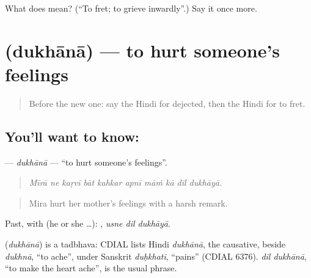 \begin{tcolorbox}[breakable,colback=teal!4,colframe=teal!35!black,title={Before you move on}]
What does  mean? (\textquotedblleft{}To fret; to grieve inwardly\textquotedblright{}.) Say it once more.
\end{tcolorbox}
\section[\texorpdfstring{\hi{दुखाना} (dukhānā)}{दुखाना (dukhānā)}]{ (dukhānā) — to hurt someone's feelings}

\label{lesson:HI-C455-dukhana}



\begin{quote}
Before the new one: say the Hindi for dejected, then the Hindi for to fret.
\end{quote}

\subsection*{You'll want to know: }
\textbf{} — \emph{dukhānā} — \textquotedblleft{}to hurt someone's feelings\textquotedblright{}.

\begin{quote}
         
\end{quote}

\begin{quote}
\emph{Mīrā ne kaṛvī bāt kahkar apnī māṁ kā dil dukhāyā.}
\end{quote}

\begin{quote}
Mira hurt her mother's feelings with a harsh remark.
\end{quote}

Past, with  (he or she …):   , \emph{usne dil dukhāyā}.

\begin{cousinweb}
\textbf{} (\emph{dukhānā}) is a tadbhava: CDIAL lists Hindi \emph{dukhānā}, the causative, beside \emph{dukhnā}, \textquotedblleft{}to ache\textquotedblright{}, under Sanskrit \emph{duḥkhati}, \textquotedblleft{}pains\textquotedblright{} (CDIAL 6376). \emph{dil dukhānā}, \textquotedblleft{}to make the heart ache\textquotedblright{}, is the usual phrase.
\end{cousinweb}

